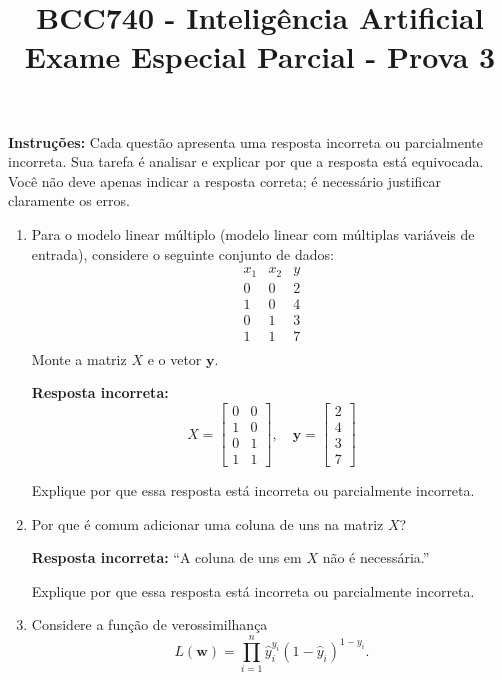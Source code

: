 \documentclass[12pt]{article}
\title{BCC740 - Inteligência Artificial \\ Exame Especial Parcial - Prova 3}
\author{}
\date{}
\begin{document}
\maketitle

\vspace{-1.5cm}

\noindent \textbf{Instruções:}  
Cada questão apresenta uma resposta incorreta ou parcialmente incorreta. Sua tarefa é analisar e explicar por que a resposta está equivocada.  
Você não deve apenas indicar a resposta correta; é necessário justificar claramente os erros.

\begin{enumerate}
    \item Para o modelo linear múltiplo (modelo linear com múltiplas variáveis de entrada), considere o seguinte conjunto de dados:
    \[
    \begin{array}{ccc}
      x_1 & x_2 & y \\
      \hline
      0 & 0 & 2 \\
      1 & 0 & 4 \\
      0 & 1 & 3 \\
      1 & 1 & 7 \\
    \end{array}
    \]
    Monte a matriz \(X\) e o vetor \(\bm{y}\).

    \textbf{Resposta incorreta:}
    \[
    X = \begin{bmatrix}
    0 & 0 \\
    1 & 0 \\
    0 & 1 \\
    1 & 1
    \end{bmatrix}, \quad
    \bm{y} = \begin{bmatrix}2 \\ 4 \\ 3 \\ 7\end{bmatrix}
    \]

    Explique por que essa resposta está incorreta ou parcialmente incorreta.

    \item Por que é comum adicionar uma coluna de uns na matriz \(X\)?

    \textbf{Resposta incorreta:}  
    “A coluna de uns em \(X\) não é necessária.”

    Explique por que essa resposta está incorreta ou parcialmente incorreta.


    
    \item Considere a função de verossimilhança
    \[
    L(\bm{w}) = \prod_{i=1}^{n} \hat{y}_i^{y_i}(1-\hat{y}_i)^{1-y_i}.
    \]
    

\end{enumerate}
\end{document}
